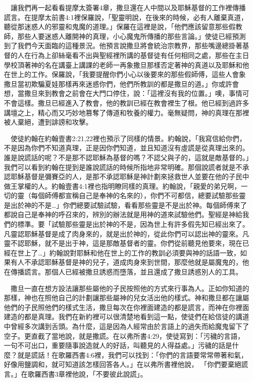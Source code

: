 \documentclass{book}
\begin{document}
　讓我們再一起看看提摩太簽署4章，撒旦還在人中間以及耶穌基督的工作裡傳播謊言。在提摩太前書4:1裡保羅說，「聖靈明說，在後來的時候，必有人離棄真道，聽從那迷惑人的邪靈和鬼魔的道理。」保羅在這裡是說，「他們應該留意那些假教師，那些人要迷惑人離開神的真理，小心魔鬼所傳播的那些言論。」使徒已經預測到了我們今天面臨的這種景況。他預言說撒旦將會統治宗教界，那些嘴邊總掛著基督的人在行為上卻絲毫看不出與聖經裡所講的基督徒有任何相同之處，那些在主日學校頂著神的名在講臺上講課的老師一再象撒旦那樣否定著神的真道以及耶穌和他在世上的工作。保羅說，「我要提醒你們小心以後要來的那些假師傅，這些人會象撒旦當初欺騙夏娃那樣再來迷惑你們，他們所教訓的都是撒旦的道。」你或許會想，當撒旦來到教會之前會在大門口停住，說：「這裡沒有我的位置。」噢，事情可不會這樣。撒旦已經進入了教會，他的教訓已經在教會裡生了根。他已經到過許多講壇之上，精心而又巧妙地篡奪了傳道和牧養的權力。毫無疑問，神的真理在那裡被人棄絕，遭到誹謗和攻擊。

　使徒約翰在約翰壹書2:21,22裡也預示了同樣的情景。約翰說，「我寫信給你們，不是因為你們不知道真理，正是因你們知道，並且知道沒有虛謊是從真理出來的。誰是說謊話的呢？不是那不認耶穌為基督的嗎？不認父與子的，這就是敵基督的。」我們可以看到約翰在提到是誰說謊話的時候所指地非常明確。那個說謊者就是不承認耶穌基督是彌賽亞的人，是那不承認耶穌是神計劃來拯救世人並要在他的子民中做王掌權的人。約翰壹書4:1裡也指明瞭同樣的真理。約翰說，「親愛的弟兄啊，一切的靈（每個師傅都宣稱自己是奉神的名來的），你們不可都信，總要試驗那些靈是出於神的不是…」你們總要試驗試驗，看看那些靈是不是出於神。每個師傅來了都說自己是奉神的呼召來的，辨別的辦法就是用神的道來試驗他們。聖經是神給我們的標準。要「試驗那些靈是出於神的不是，因為世上有許多假先知已經出來了。凡靈認耶穌基督是成了肉身來的，就是出於神的，從此你們可以認出神的靈來。凡靈不認耶穌，就不是出于神，這是那敵基督者的靈。你們從前聽見他要來，現在已經在世上了…」約翰說對耶穌和他在世上的工作的教訓必須要與神的話語一致，如果有人不承認耶穌基督是神的兒子，道成肉身來到世間，那麼他就是屬魔鬼的，他在傳播謊言。那個人已經被撒旦誘惑而墮落，並且還成了撒旦誘惑別人的工具。

　撒旦一直在想方設法讓那些屬他的子民按照他的方式來行事為人。正如你知道的那樣，神也在照他自己的計劃讓那些屬神的兒女活出他的樣式。神和撒旦都在讓屬他們的子民照他們的樣式生活，撒旦每次在你裡面建造的都是謊言，而神在你裡面建造的都是真理。我們在新約裡可以很清楚地看到這一點，使徒們在給信徒的講道中曾經多次講到舌頭。為什麼，這是因為人經常由於言語上的過失而給魔鬼留下了空子。更直截了當地說，就是撒謊。在以弗所書4:29，使徒寫到：「污穢的言語，一句不可出口，重要隨事說造就人的好話，叫聽見的人得益處。」污穢的話是什麼？就是謊話！在歌羅西書4:6裡，我們可以找到：「你們的言語要常常帶著和氣，好像用鹽調和，就可知道該怎樣回答各人。」在以弗所書裡他說， 「你們要棄絕謊言。」在歌羅西書3章裡他說，「不要彼此說謊」。
\end{document}

